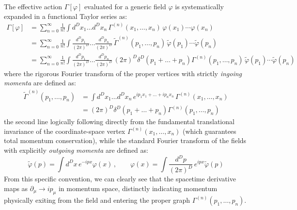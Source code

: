 The effective action $\Gamma[\varphi]$ evaluated for a generic field $\varphi$ is systematically expanded in a functional Taylor series as:
\begin{equation} \label{eq:effective_action_expansion}
    \begin{aligned}
        \Gamma[\varphi] & = \sum_{n=0}^\infty \frac{1}{n!} \int d^D x_1 \dots d^D x_n \, \Gamma^{(n)}(x_1, \dots, x_n) \, \varphi(x_1) \cdots \varphi(x_n)                                                                                        \\
                        & = \sum_{n=0}^\infty \frac{1}{n!} \int \frac{d^D p_1}{(2\pi)^D} \dots \frac{d^D p_n}{(2\pi)^D} \, \tilde{\Gamma}^{(n)}(p_1, \dots, p_n) \, \tilde{\varphi}(p_1) \cdots \tilde{\varphi}(p_n)                              \\
                        & = \sum_{n=0}^\infty \frac{1}{n!} \int \frac{d^D p_1}{(2\pi)^D} \dots \frac{d^D p_n}{(2\pi)^D} \, (2\pi)^D \delta^D(p_1 + \dots + p_n) \Gamma^{(n)}(p_1, \dots, p_n) \, \tilde{\varphi}(p_1) \cdots \tilde{\varphi}(p_n)
    \end{aligned}
\end{equation}
where the rigorous Fourier transform of the proper vertices with strictly \textit{ingoing momenta} are defined as:
\begin{equation} \label{eq:proper_vertices_ft}
    \begin{aligned}
        \tilde{\Gamma}^{(n)}(p_1, \dots, p_n) & = \int d^D x_1 \dots d^D x_n \, e^{i p_1 x_1 + \dots + i p_n x_n} \, \Gamma^{(n)}(x_1, \dots, x_n) \\
                                              & = (2\pi)^D \delta^D(p_1 + \dots + p_n) \Gamma^{(n)}(p_1, \dots, p_n)
    \end{aligned}
\end{equation}
the second line logically following directly from the fundamental translational invariance of the coordinate-space vertex $\Gamma^{(n)}(x_1, \dots, x_n)$ (which guarantees total momentum conservation), while the standard Fourier transform of the fields with explicitly \textit{outgoing momenta} are defined as:
\begin{equation} \label{eq:field_ft}
    \tilde{\varphi}(p) = \int d^D x \, e^{-ipx} \varphi(x) \, , \qquad \varphi(x) = \int \frac{d^D p}{(2\pi)^D} \, e^{ipx} \tilde{\varphi}(p)
\end{equation}
From this specific convention, we can clearly see that the spacetime derivative maps as $\partial_\mu \rightarrow ip_\mu$ in momentum space, distinctly indicating momentum physically exiting from the field and entering the proper graph $\Gamma^{(n)}(p_1, \dots, p_n)$.

